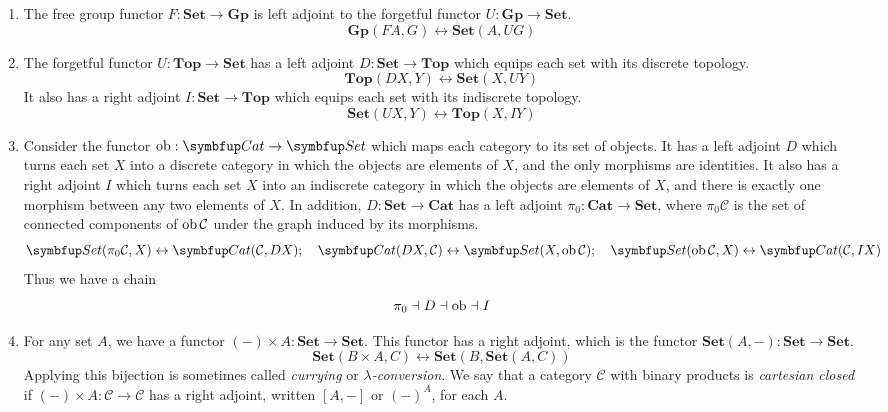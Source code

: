 \begin{example}
    \begin{enumerate}
        \item The free group functor \( F : \mathbf{Set} \to \mathbf{Gp} \) is left adjoint to the forgetful functor \( U : \mathbf{Gp} \to \mathbf{Set} \).
        \[ \mathbf{Gp}(FA, G) \leftrightarrow \mathbf{Set}(A, UG) \]
        \item The forgetful functor \( U : \mathbf{Top} \to \mathbf{Set} \) has a left adjoint \( D : \mathbf{Set} \to \mathbf{Top} \) which equips each set with its discrete topology.
        \[ \mathbf{Top}(DX, Y) \leftrightarrow \mathbf{Set}(X, UY) \]
        It also has a right adjoint \( I : \mathbf{Set} \to \mathbf{Top} \) which equips each set with its indiscrete topology.
        \[ \mathbf{Set}(UX, Y) \leftrightarrow \mathbf{Top}(X, IY) \]
        \item Consider the functor \( \ob : \mathbf{Cat} \to \mathbf{Set} \) which maps each category to its set of objects.
        It has a left adjoint \( D \) which turns each set \( X \) into a discrete category in which the objects are elements of \( X \), and the only morphisms are identities.
        It also has a right adjoint \( I \) which turns each set \( X \) into an indiscrete category in which the objects are elements of \( X \), and there is exactly one morphism between any two elements of \( X \).
        In addition, \( D : \mathbf{Set} \to \mathbf{Cat} \) has a left adjoint \( \pi_0 : \mathbf{Cat} \to \mathbf{Set} \), where \( \pi_0 \mathcal C \) is the set of connected components of \( \operatorname{ob} \mathcal C \) under the graph induced by its morphisms.
        \[ \mathbf{Set}(\pi_0 \mathcal C, X) \leftrightarrow \mathbf{Cat}(\mathcal C, DX);\quad \mathbf{Cat}(D X, \mathcal C) \leftrightarrow \mathbf{Set}(X, \ob \mathcal C);\quad \mathbf{Set}(\ob \mathcal C, X) \leftrightarrow \mathbf{Cat}(\mathcal C, IX) \]
        Thus we have a chain
        \[ \pi_0 \dashv D \dashv \operatorname{ob} \dashv I \]
        \item For any set \( A \), we have a functor \( (-) \times A : \mathbf{Set} \to \mathbf{Set} \).
        This functor has a right adjoint, which is the functor \( \mathbf{Set}(A, -) : \mathbf{Set} \to \mathbf{Set} \).
        \[ \mathbf{Set}(B \times A, C) \leftrightarrow \mathbf{Set}(B, \mathbf{Set}(A, C)) \]
        Applying this bijection is sometimes called \emph{currying} or \emph{\( \lambda \)-conversion}.
        We say that a category \( \mathcal C \) with binary products is \emph{cartesian closed} if \( (-) \times A : \mathcal C \to \mathcal C \) has a right adjoint, written \( [A, -] \) or \( (-)^A \), for each \( A \).

\end{enumerate}
\end{example}
